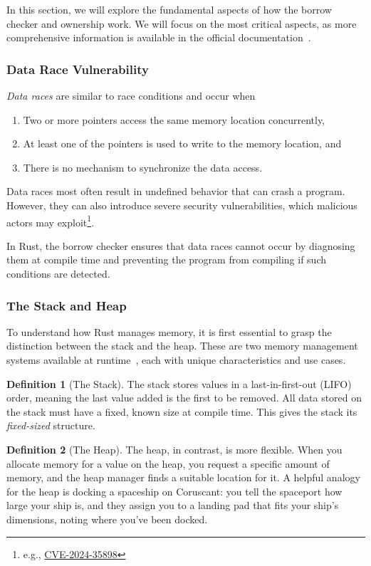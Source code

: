 \documentclass[11pt]{report}
\theoremstyle{definition}
\newtheorem{definition}{Definition}[section]
\theoremstyle{plain}
\begin{document}
In this section, we will explore the fundamental aspects of how the borrow checker and ownership work. We will focus on the most critical aspects, as more comprehensive information is available in the official documentation~\cite{rustlangRustProgramming}.

\subsubsection{Data Race Vulnerability}
\textit{Data races} are similar to race conditions and occur when
\begin{enumerate}[parsep=0pt, itemsep=0pt, topsep=0pt]
  \item Two or more pointers access the same memory location concurrently,
  \item At least one of the pointers is used to write to the memory location, and
  \item There is no mechanism to synchronize the data access.
\end{enumerate}

Data races most often result in undefined behavior that can crash a program. However, they can also introduce severe security vulnerabilities, which malicious actors may exploit\footnote{e.g., \href{https://nvd.nist.gov/vuln/detail/cve-2024-35898}{CVE-2024-35898}}.

In Rust, the borrow checker ensures that data races cannot occur by diagnosing them at compile time and preventing the program from compiling if such conditions are detected.

\subsubsection{The Stack and Heap}
To understand how Rust manages memory, it is first essential to grasp the distinction between the stack and the heap. These are two memory management systems available at runtime~\cite[ch.4]{rustlangRustProgramming}, each with unique characteristics and use cases.

\begin{definition}[The Stack]
  The stack stores values in a last-in-first-out (LIFO) order, meaning the last value added is the first to be removed. All data stored on the stack must have a fixed, known size at compile time. This gives the stack its \textit{fixed-sized} structure.
\end{definition}

\begin{definition}[The Heap]
  The heap, in contrast, is more flexible. When you allocate memory for a value on the heap, you request a specific amount of memory, and the heap manager finds a suitable location for it. A helpful analogy for the heap is docking a spaceship on Coruscant: you tell the spaceport how large your ship is, and they assign you to a landing pad that fits your ship's dimensions, noting where you've been docked.
\end{definition}
\end{document}
